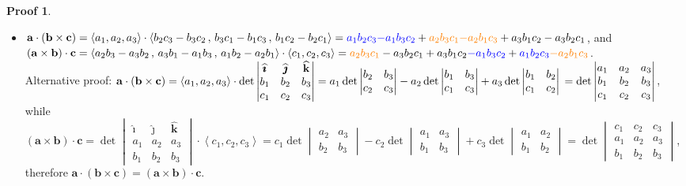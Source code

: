 \documentclass[12pt]{extarticle}
\newcommand{\ds}{\displaystyle}
\newcommand{\llt}{\left\langle}
\newcommand{\rgt}{\right\rangle}
\theoremstyle{definition}
\newtheorem*{prf}{Proof}
\newcommand{\va}{\mathbf{a}}
\newcommand{\vb}{\mathbf{b}}
\newcommand{\vc}{\mathbf{c}}
\newcommand{\hi}{\widehat{\pmb{\imath}}}
\newcommand{\hj}{\widehat{\pmb{\jmath}}}
\newcommand{\hk}{\widehat{\mathbf{k}}}
\begin{document}
\begin{prf}
\begin{itemize}
    \item $\ds\va\cdot(\vb\times\vc) = \llt a_1,a_2,a_3\rgt\cdot\llt b_2c_3-b_3c_2\,,\, b_3c_1-b_1c_3\,,\, b_1c_2-b_2c_1\rgt = \textcolor{blue}{a_1b_2c_3}\textcolor{blue}{-a_1b_3c_2} + \textcolor{orange}{a_2b_3c_1}\textcolor{orange}{-a_2b_1c_3} + a_3b_1c_2 - a_3b_2c_1$, and $\ds(\va\times\vb)\cdot\vc =\llt a_2b_3-a_3b_2\,,\, a_3b_1-a_1b_3\,,\, a_1b_2-a_2b_1\rgt\cdot\llt c_1,c_2,c_3\rgt = \textcolor{orange}{a_2b_3c_1} - a_3b_2c_1 + a_3b_1c_2\textcolor{blue}{-a_1b_3c_2} + \textcolor{blue}{a_1b_2c_3}\textcolor{orange}{-a_2b_1c_3}$. \\Alternative proof: $\ds\va\cdot(\vb\times\vc) = \llt a_1,a_2,a_3\rgt\cdot\det\begin{vmatrix}\hi&\hj&\hk\\ b_1&b_2&b_3\\ c_1&c_2&c_3\end{vmatrix} = a_1\det\begin{vmatrix}b_2&b_3\\c_2&c_3\end{vmatrix} - a_2\det\begin{vmatrix}b_1&b_3\\c_1&c_3\end{vmatrix} + a_3\det\begin{vmatrix} b_1&b_2\\c_1&c_2\end{vmatrix} \\ = \det\begin{vmatrix}a_1&a_2&a_3\\b_1&b_2&b_3\\c_1&c_2&c_3\end{vmatrix}$, while $\ds(\va\times\vb)\cdot\vc = \det\begin{vmatrix}\hi&\hj&\hk\\a_1&a_2&a_3\\ b_1&b_2&b_3\end{vmatrix}\cdot\llt c_1,c_2,c_3\rgt = c_1\det\begin{vmatrix}a_2&a_3\\ b_2&b_3\end{vmatrix}-c_2\det\begin{vmatrix}a_1&a_3\\ b_1&b_3\end{vmatrix} + c_3\det\begin{vmatrix}a_1&a_2\\b_1&b_2\end{vmatrix} = \det\begin{vmatrix}c_1&c_2&c_3\\a_1&a_2&a_3\\b_1&b_2&b_3\end{vmatrix}$, therefore $\va\cdot(\vb\times\vc) = (\va\times\vb)\cdot\vc$. 

\end{itemize}
\end{prf}
\end{document}

